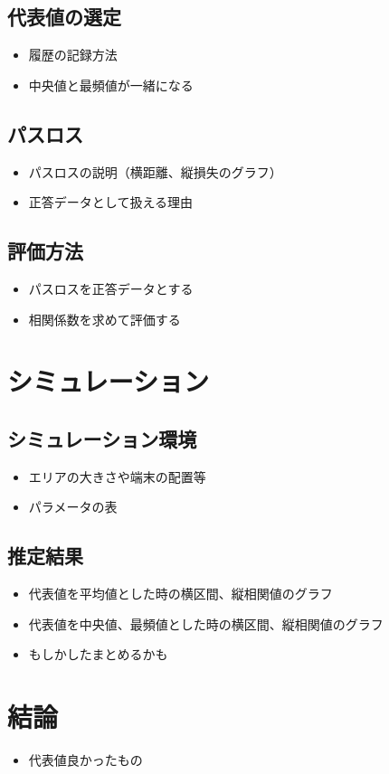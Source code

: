 \section{代表値の選定}
\begin{itemize}
  \item 履歴の記録方法
  \item 中央値と最頻値が一緒になる
\end{itemize}

\section{パスロス}
\begin{itemize}
  \item パスロスの説明（横距離、縦損失のグラフ）
  \item 正答データとして扱える理由
\end{itemize}

\section{評価方法}
\begin{itemize}
  \item パスロスを正答データとする
  \item 相関係数を求めて評価する
\end{itemize}

\chapter{シミュレーション}
\section{シミュレーション環境}
\begin{itemize}
  \item エリアの大きさや端末の配置等
  \item パラメータの表
\end{itemize}

\section{推定結果}
\begin{itemize}
  \item 代表値を平均値とした時の横区間、縦相関値のグラフ
  \item 代表値を中央値、最頻値とした時の横区間、縦相関値のグラフ
  \item もしかしたまとめるかも
\end{itemize}

\chapter{結論}
\begin{itemize}
  \item 代表値良かったもの
\end{itemize}